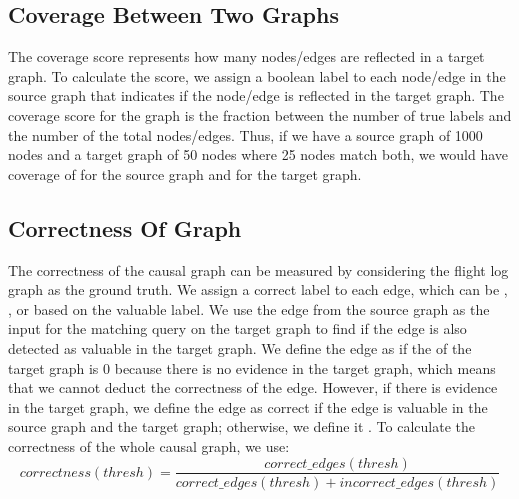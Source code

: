 \subsection{Coverage Between Two Graphs}\label{subsec:coverage-between-two-graphs}
The coverage score represents how many nodes/edges are reflected in a target graph.
To calculate the score, we assign a boolean label to each node/edge in the source graph that indicates if the node/edge is reflected in the target graph.
The coverage score for the graph is the fraction between the number of true labels and the number of the total nodes/edges.
Thus, if we have a source graph of 1000 nodes and a target graph of 50 nodes where 25 nodes match both, we would have coverage of  for the source graph and  for the target graph.

\subsection{Correctness Of Graph}\label{subsec:correctness-of-graph}
The correctness of the causal graph can be measured by considering the flight log graph as the ground truth.
We assign a correct label to each edge, which can be , , or  based on the valuable label.
We use the edge from the source graph as the input for the matching query on the target graph to find if the edge is also detected as valuable in the target graph.
We define the edge as  if the  of the target graph is 0 because there is no evidence in the target graph, which means that we cannot deduct the correctness of the edge.
However, if there is evidence in the target graph, we define the edge as correct if the edge is valuable in the source graph and the target graph; otherwise, we define it .
To calculate the correctness of the whole causal graph, we use:
\begin{equation}
    \label{eq:correctness}
    correctness(thresh) = \frac{correct\_edges(thresh)}{correct\_edges(thresh) + incorrect\_edges(thresh)}
\end{equation}
